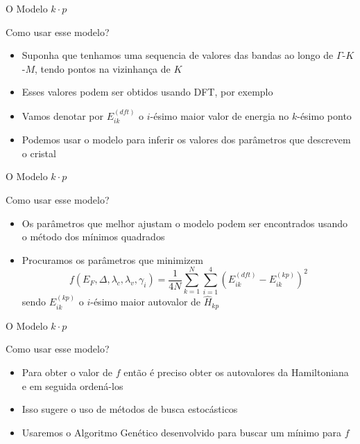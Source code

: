 \begin{frame}{O Modelo $k \cdot p$}
  \begin{block}{Como usar esse modelo?}
    \begin{itemize}
      \item Suponha que tenhamos uma sequencia de valores das bandas ao longo de
            $\Gamma$-$K$-$M$, tendo pontos na vizinhança de $K$
      \item Esses valores podem ser obtidos usando DFT, por exemplo
      \item Vamos denotar por $ E_{ik}^{(dft)} $ o $i$-ésimo maior valor de
            energia no $k$-ésimo ponto
      \item Podemos usar o modelo para inferir os valores dos parâmetros que descrevem o cristal
    \end{itemize}
  \end{block}
\end{frame}

\begin{frame}{O Modelo $k \cdot p$}
  \begin{block}{Como usar esse modelo?}
    \begin{itemize}
      \item Os parâmetros que melhor ajustam o modelo podem ser encontrados
            usando o método dos mínimos quadrados
      \item Procuramos os parâmetros que minimizem
            $$
              f(E_F, \Delta, \lambda_c, \lambda_v, \gamma_i) =
              \frac{1}{4 N} \sum_{k=1}^N \sum_{i=1}^4 \left( E_{ik}^{(dft)} - E_{ik}^{(kp)} \right)^2
            $$
            sendo $E_{ik}^{(kp)}$ o $i$-ésimo maior autovalor de $\hat{H}_{kp}$
    \end{itemize}
  \end{block}
\end{frame}

\begin{frame}{O Modelo $k \cdot p$}
  \begin{block}{Como usar esse modelo?}
    \begin{itemize}
      \item Para obter o valor de $f$ então é preciso obter os autovalores da
            Hamiltoniana e em seguida ordená-los
      \item Isso sugere o uso de métodos de busca estocásticos
      \item Usaremos o Algoritmo Genético desenvolvido para buscar um mínimo
            para $f$
    \end{itemize}
  \end{block}
\end{frame}

